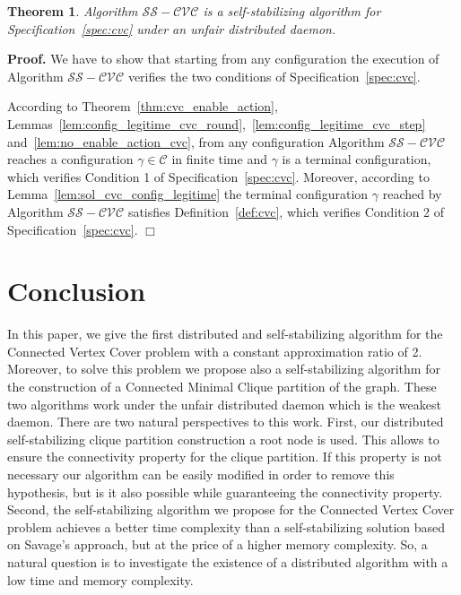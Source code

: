 \documentclass[11pt,letterpaper,onecolumn]{article}
\newtheorem{theorem}{Theorem}
\newenvironment{proof}{\noindent \begin{rm}{\textbf{Proof.} }}{\hspace*{\fill}$\Box$\par\end{rm} \vspace{.3cm}}
\begin{document}
\begin{theorem}
Algorithm $\mathcal{SS-CVC}$ is a self-stabilizing algorithm for Specification~\ref{spec:cvc} under an unfair distributed daemon.
\end{theorem}

\begin{proof}
We have to show that starting from any configuration the execution of Algorithm $\mathcal{SS-CVC}$ verifies the two conditions of Specification~\ref{spec:cvc}.

According to Theorem~\ref{thm:cvc_enable_action}, Lemmas~\ref{lem:config_legitime_cvc_round},~\ref{lem:config_legitime_cvc_step} and~\ref{lem:no_enable_action_cvc}, from any configuration Algorithm $\mathcal{SS-CVC}$ reaches a configuration $\gamma \in \mathcal{C}$ in finite time and $\gamma$ is a terminal configuration, which verifies Condition 1 of Specification~\ref{spec:cvc}. Moreover, according to Lemma~\ref{lem:sol_cvc_config_legitime} the terminal configuration $\gamma$ reached by Algorithm $\mathcal{SS-CVC}$ satisfies Definition~\ref{def:cvc}, which verifies Condition 2 of Specification~\ref{spec:cvc}.
\end{proof}

\section{Conclusion}
In this paper, we give the first distributed and self-stabilizing algorithm for the Connected Vertex Cover problem with a constant approximation ratio of 2. Moreover, to solve this problem we propose also a self-stabilizing algorithm for the construction of a Connected Minimal Clique partition of the graph. These two algorithms work under the unfair distributed daemon which is the weakest daemon.
There are two natural perspectives to this work. First, our distributed self-stabilizing clique partition construction a root node is used. This allows to ensure the connectivity property for the clique partition. If this property is not necessary our algorithm can be easily modified in order to remove this hypothesis, but is it also possible while guaranteeing the connectivity property. Second, the self-stabilizing algorithm we propose for the Connected Vertex Cover problem achieves a better time complexity than a self-stabilizing solution based on Savage's approach, but at the price of a higher memory complexity. So, a natural question is to investigate the existence of a distributed algorithm with a low time and memory complexity.






\end{document}
